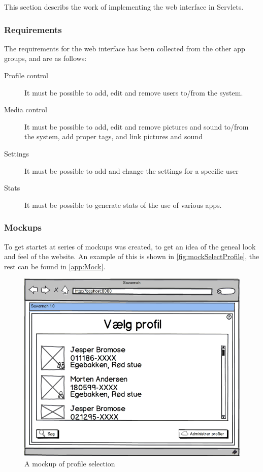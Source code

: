 This section describs the work of implementing the web interface in Servlets.

\subsubsection{Requirements}
\label{subsec:webReq}
The requirements for the web interface has been collected from the other app groups, and are as follows:
\begin{description}
	\item[Profile control] It must be possible to add, edit and remove users to/from the system.
	\item[Media control] It must be possible to add, edit and remove pictures and sound to/from the system, add proper tags, and link pictures and sound
	\item[Settings] It must be possible to add and change the settings for a specific user
	\item[Stats] It must be possible to generate stats of the use of various apps.
\end{description}

\subsubsection{Mockups}
To get startet at series of mockups was created, to get an idea of the geneal look and feel of the website. An example of this is shown in \autoref{fig:mockSelectProfile}, the rest can be found in \autoref{app:Mock}.

\begin{figure}[htbp]
	\centering
		\includegraphics[width=1.00\textwidth]{images/mockSelectProfile.png}
	\caption{A mockup of profile selection}
	\label{fig:mockSelectProfile}
\end{figure}

